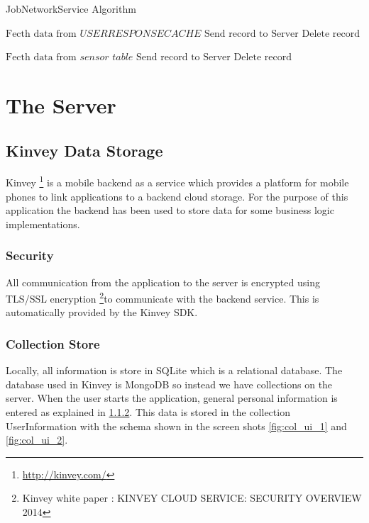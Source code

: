 \begin{algorithm}
\caption{JobNetworkService Algorithm}\label{nextday}
\begin{algorithmic}[1]
\State $ \text{Fecth data from } \textit{USERRESPONSECACHE}$
  \State $\text{Send record to Server}$
  \State $\text{Delete record}$  
  \EndIf
  \EndIf
 	\EndFor

 	 \State $ \text{Fecth data from } \textit{sensor table}$
  \State $\text{Send record to Server}$
  \State $\text{Delete record}$  
  \EndIf
  \EndIf
 	\EndFor
	
 	\EndFor
\EndProcedure
\end{algorithmic}
\end{algorithm}



\section{The Server}

\subsection{Kinvey Data Storage}

Kinvey \footnote{\url{http://kinvey.com/}} is a mobile backend as a service which provides a platform for mobile phones to link applications to a backend cloud storage. For the purpose of this application the backend has been used to store data for some business logic implementations.
\subsubsection{Security}
All communication from the application to the server is encrypted using TLS/SSL encryption \footnote{Kinvey white paper : KINVEY CLOUD
SERVICE: SECURITY
OVERVIEW 2014}to communicate with the backend service. This is automatically provided by the Kinvey SDK.

\subsubsection{Collection Store}

Locally, all information is store in SQLite which is a relational database. The database used in Kinvey is MongoDB so instead we have collections 
on the server.
When the user starts the application, general personal information is entered as explained in \ref{}. This data is stored in the
collection UserInformation with the schema shown in the screen shots \ref{fig:col_ui_1} and \ref{fig:col_ui_2}.

